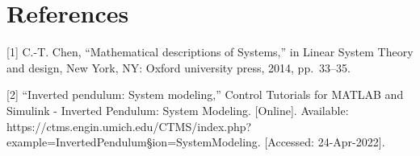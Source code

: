 \documentclass[11pt]{article}
\begin{document}
\section{References}\label{references}

{[}1{]} C.-T. Chen, ``Mathematical descriptions of Systems,'' in Linear
System Theory and design, New York, NY: Oxford university press, 2014,
pp.~33--35.

{[}2{]} ``Inverted pendulum: System modeling,'' Control Tutorials for
MATLAB and Simulink - Inverted Pendulum: System Modeling. {[}Online{]}.
Available:
https://ctms.engin.umich.edu/CTMS/index.php?example=InvertedPendulum§ion=SystemModeling.
{[}Accessed: 24-Apr-2022{]}.



    
    
    
\end{document}
